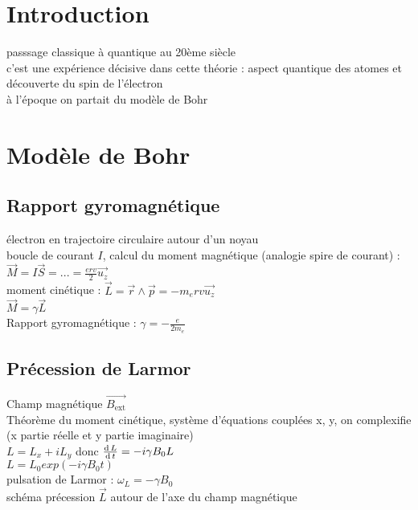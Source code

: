 


\biblio{}

\section*{Introduction}
passsage classique à quantique au 20ème siècle \\
c'est une expérience décisive dans cette théorie : aspect quantique des atomes et découverte du spin de l'électron  \\
à l'époque on partait du modèle de Bohr \\


\section{Modèle de Bohr}
\subsection{Rapport gyromagnétique}
électron en trajectoire circulaire autour d'un noyau \\
boucle de courant $I$, calcul du moment magnétique (analogie spire de courant) : $\vec{M}=I \vec{S}=...=\frac{erv}{2} \vec{u_z} $\\
moment cinétique : $\vec{L}=\vec{r} \wedge \vec{p}=-m_e r v \vec{u_z}$ \\
$\vec{M}=\gamma \vec{L}$ \\
Rapport gyromagnétique : $\gamma=-\frac{e}{2 m_e}$ \\

\subsection{Précession de Larmor}
Champ magnétique $\vec{B_\mathrm{ext}}$ \\
Théorème du moment cinétique, système d'équations couplées x, y, on complexifie (x partie réelle et y partie imaginaire) \\
$L=L_x + i L_y $ donc 
$\frac{\mathrm{d}\, L}{\mathrm{d}\, t}=-i \gamma B_0 L$ \\
$L=L_0 exp(-i \gamma B_0 t)$ \\
pulsation de Larmor : $\omega_L = -\gamma B_0$ \\
schéma précession $\vec{L}$ autour de l'axe du champ magnétique \\

